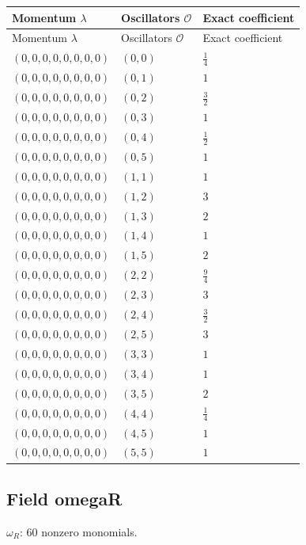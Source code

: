 \begingroup\scriptsize
\setlength{\tabcolsep}{5pt}
\begin{longtable}{@{}lll@{}}
\toprule
Momentum $\lambda$ & Oscillators $\mathcal O$ & Exact coefficient\\
\midrule\endfirsthead
\toprule
Momentum $\lambda$ & Oscillators $\mathcal O$ & Exact coefficient\\
\midrule\endhead
\bottomrule\endfoot
$(0,0,0,0,0,0,0,0)$ & $(0,0)$ & $\frac{1}{4}$\\
$(0,0,0,0,0,0,0,0)$ & $(0,1)$ & $1$\\
$(0,0,0,0,0,0,0,0)$ & $(0,2)$ & $\frac{3}{2}$\\
$(0,0,0,0,0,0,0,0)$ & $(0,3)$ & $1$\\
$(0,0,0,0,0,0,0,0)$ & $(0,4)$ & $\frac{1}{2}$\\
$(0,0,0,0,0,0,0,0)$ & $(0,5)$ & $1$\\
$(0,0,0,0,0,0,0,0)$ & $(1,1)$ & $1$\\
$(0,0,0,0,0,0,0,0)$ & $(1,2)$ & $3$\\
$(0,0,0,0,0,0,0,0)$ & $(1,3)$ & $2$\\
$(0,0,0,0,0,0,0,0)$ & $(1,4)$ & $1$\\
$(0,0,0,0,0,0,0,0)$ & $(1,5)$ & $2$\\
$(0,0,0,0,0,0,0,0)$ & $(2,2)$ & $\frac{9}{4}$\\
$(0,0,0,0,0,0,0,0)$ & $(2,3)$ & $3$\\
$(0,0,0,0,0,0,0,0)$ & $(2,4)$ & $\frac{3}{2}$\\
$(0,0,0,0,0,0,0,0)$ & $(2,5)$ & $3$\\
$(0,0,0,0,0,0,0,0)$ & $(3,3)$ & $1$\\
$(0,0,0,0,0,0,0,0)$ & $(3,4)$ & $1$\\
$(0,0,0,0,0,0,0,0)$ & $(3,5)$ & $2$\\
$(0,0,0,0,0,0,0,0)$ & $(4,4)$ & $\frac{1}{4}$\\
$(0,0,0,0,0,0,0,0)$ & $(4,5)$ & $1$\\
$(0,0,0,0,0,0,0,0)$ & $(5,5)$ & $1$\\
\end{longtable}
\endgroup

\subsection{Field omegaR}
$\omega_R$: 60 nonzero monomials.

